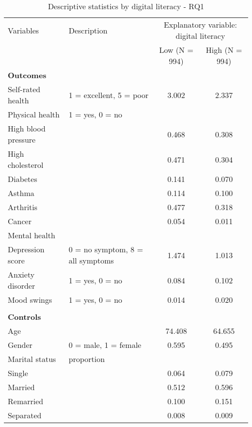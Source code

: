 \documentclass[12pt]{article}
\begin{document}
    \begin{sidewaystable}[h!]
        \centering
        \caption{Descriptive statistics by digital literacy - RQ1}
        \label{tab:desc_stats_q1}
        \begin{tabular}{llcc}
            \toprule
            Variables & Description & \multicolumn{2}{c}{Explanatory variable: digital literacy} \\
            & & Low (N = 994) & High (N = 994) \\
            \midrule
            \textbf{Outcomes} & & & \\
            Self-rated health & 1 = excellent, 5 = poor & 3.002 & 2.337 \\
            Physical health & 1 = yes, 0 = no & \\
            High blood pressure &  & 0.468 & 0.308 \\
            High cholesterol &  & 0.471 & 0.304 \\
            Diabetes &  & 0.141 & 0.070 \\
            Asthma &  & 0.114 & 0.100 \\
            Arthritis &  & 0.477 & 0.318 \\
            Cancer &  & 0.054 & 0.011 \\
            Mental health & & \\
            Depression score & 0 = no symptom, 8 = all symptoms & 1.474 & 1.013 \\
            Anxiety disorder & 1 = yes, 0 = no & 0.084 & 0.102 \\
            Mood swings & 1 = yes, 0 = no & 0.014 & 0.020 \\
            & & & \\
            \textbf{Controls} & & & \\
            Age &  & 74.408 & 64.655 \\
            Gender & 0 = male, 1 = female & 0.595 & 0.495 \\
            Marital status & proportion & & \\
            \hspace{0.5cm} Single &  & 0.064 & 0.079 \\
            \hspace{0.5cm} Married &  & 0.512 & 0.596 \\
            \hspace{0.5cm} Remarried &  & 0.100 & 0.151 \\
            \hspace{0.5cm} Separated &  & 0.008 & 0.009 \\

\end{tabular}
\end{sidewaystable}
\end{document}
